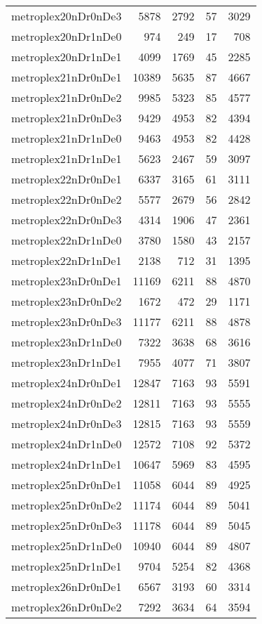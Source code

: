 \begin{longtable}{lrrrr}
metroplex20nDr0nDe3 & 5878 & 2792 & 57 & 3029 \\
metroplex20nDr1nDe0 & 974 & 249 & 17 & 708 \\
metroplex20nDr1nDe1 & 4099 & 1769 & 45 & 2285 \\
metroplex21nDr0nDe1 & 10389 & 5635 & 87 & 4667 \\
metroplex21nDr0nDe2 & 9985 & 5323 & 85 & 4577 \\
metroplex21nDr0nDe3 & 9429 & 4953 & 82 & 4394 \\
metroplex21nDr1nDe0 & 9463 & 4953 & 82 & 4428 \\
metroplex21nDr1nDe1 & 5623 & 2467 & 59 & 3097 \\
metroplex22nDr0nDe1 & 6337 & 3165 & 61 & 3111 \\
metroplex22nDr0nDe2 & 5577 & 2679 & 56 & 2842 \\
metroplex22nDr0nDe3 & 4314 & 1906 & 47 & 2361 \\
metroplex22nDr1nDe0 & 3780 & 1580 & 43 & 2157 \\
metroplex22nDr1nDe1 & 2138 & 712 & 31 & 1395 \\
metroplex23nDr0nDe1 & 11169 & 6211 & 88 & 4870 \\
metroplex23nDr0nDe2 & 1672 & 472 & 29 & 1171 \\
metroplex23nDr0nDe3 & 11177 & 6211 & 88 & 4878 \\
metroplex23nDr1nDe0 & 7322 & 3638 & 68 & 3616 \\
metroplex23nDr1nDe1 & 7955 & 4077 & 71 & 3807 \\
metroplex24nDr0nDe1 & 12847 & 7163 & 93 & 5591 \\
metroplex24nDr0nDe2 & 12811 & 7163 & 93 & 5555 \\
metroplex24nDr0nDe3 & 12815 & 7163 & 93 & 5559 \\
metroplex24nDr1nDe0 & 12572 & 7108 & 92 & 5372 \\
metroplex24nDr1nDe1 & 10647 & 5969 & 83 & 4595 \\
metroplex25nDr0nDe1 & 11058 & 6044 & 89 & 4925 \\
metroplex25nDr0nDe2 & 11174 & 6044 & 89 & 5041 \\
metroplex25nDr0nDe3 & 11178 & 6044 & 89 & 5045 \\
metroplex25nDr1nDe0 & 10940 & 6044 & 89 & 4807 \\
metroplex25nDr1nDe1 & 9704 & 5254 & 82 & 4368 \\
metroplex26nDr0nDe1 & 6567 & 3193 & 60 & 3314 \\
metroplex26nDr0nDe2 & 7292 & 3634 & 64 & 3594 \\

\end{longtable}
